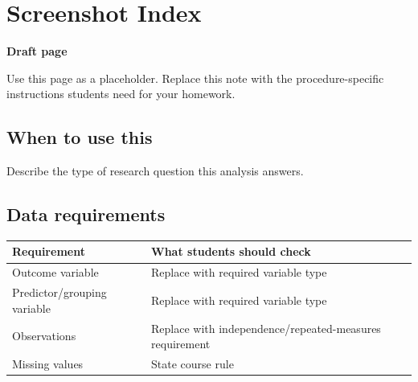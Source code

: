 \documentclass[
  letterpaper,
  DIV=11,
  numbers=noendperiod]{scrreprt}
\newcounter{none} %
\begin{document}
\chapter{Screenshot Index}\label{screenshot-index}

\begin{tcolorbox}[enhanced jigsaw, arc=.35mm, bottomrule=.15mm, breakable, colback=white, colframe=quarto-callout-note-color-frame, left=2mm, leftrule=.75mm, opacityback=0, rightrule=.15mm, toprule=.15mm]
\begin{minipage}[t]{5.5mm}
\textcolor{quarto-callout-note-color}{\faInfo}
\end{minipage}%
\begin{minipage}[t]{\textwidth - 5.5mm}

\vspace{-3mm}\textbf{Draft page}\vspace{3mm}

Use this page as a placeholder. Replace this note with the
procedure-specific instructions students need for your homework.

\end{minipage}%
\end{tcolorbox}

\section{When to use this}\label{when-to-use-this-14}

Describe the type of research question this analysis answers.

\section{Data requirements}\label{data-requirements-15}

{\def\LTcaptype{none} %
\begin{longtable}[]{@{}
  >{\raggedright\arraybackslash}p{}
  >{\raggedright\arraybackslash}p{}@{}}
\toprule\noalign{}
\begin{minipage}[b]{\linewidth}\raggedright
Requirement
\end{minipage} & \begin{minipage}[b]{\linewidth}\raggedright
What students should check
\end{minipage} \\
\midrule\noalign{}
\endhead
\bottomrule\noalign{}
\endlastfoot
Outcome variable & Replace with required variable type \\
Predictor/grouping variable & Replace with required variable type \\
Observations & Replace with independence/repeated-measures
requirement \\
Missing values & State course rule \\
\end{longtable}
}
\end{document}
